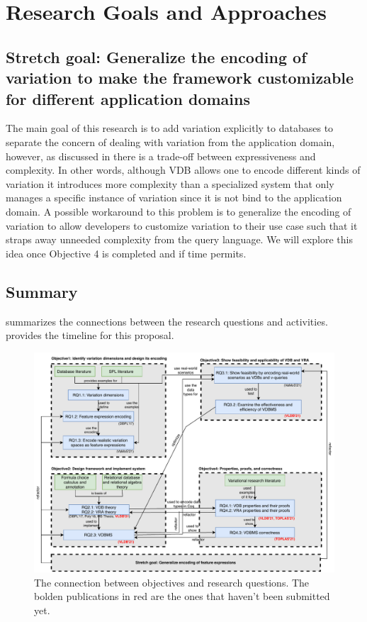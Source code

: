 \section{Research Goals and Approaches}
\label{sec:goals}







\subsection{Stretch goal: Generalize the encoding of variation to make the framework
customizable for different application domains}
\label{sec:ro5}

The main goal of this research is to add variation explicitly to 
databases to separate the concern of dealing with variation from the application
domain, however, as discussed in  there is a trade-off between 
 expressiveness and complexity. In other words, although VDB allows 
one to encode different kinds of variation it introduces more complexity than a
specialized system that only manages a specific instance of variation
since it is not bind to the application domain. 
A possible workaround to this problem is to generalize the encoding of
variation to allow developers to customize variation to their use case such 
that it straps away unneeded complexity from the query language. We will 
explore this idea once Objective 4 is completed and if time permits. 

\subsection{Summary}
\label{sec:sum}

 summarizes the connections between the research questions and activities.
 provides the timeline for this proposal.



\begin{figure}
\centering
\includegraphics[scale = 0.75] {figs/conn3.pdf}
\caption{The connection between objectives and research questions.
The bolden publications in red are the ones that haven't been submitted yet.}
\label{fig:conn}
\end{figure}

